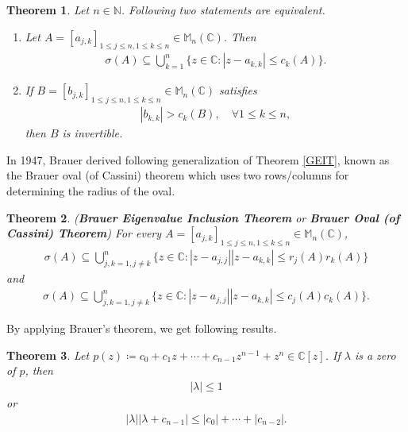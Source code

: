 \documentclass{amsart}
\newtheorem{theorem}{Theorem}[section]
\begin{document}
\begin{theorem} \cite{VARGA}
	Let $n \in \mathbb{N}$.  Following two statements are equivalent. 
	\begin{enumerate}[\upshape(i)]
		\item Let $A=[a_{j,k}]_{1\leq j\leq n, 1\leq k \leq n}\in  \mathbb{M}_n(\mathbb{C})$. Then 
		\begin{align*}
			\sigma(A)\subseteq \bigcup_{k=1}^n\{z \in \mathbb{C}: |z-a_{k,k}|\leq c_k(A)\}.
		\end{align*}
		\item 	If  $B=[b_{j,k}]_{1\leq j\leq n, 1\leq k \leq n}\in  \mathbb{M}_n(\mathbb{C})$ satisfies
		\begin{align*}
			|b_{k,k}|>c_k(B), \quad \forall 1\leq k \leq n,
		\end{align*}
		then $B$ is invertible. 
	\end{enumerate}	
\end{theorem}
In 1947, Brauer derived following generalization of Theorem \ref{GEIT}, known as the Brauer oval (of Cassini) theorem which uses two rows/columns  for determining the radius of the oval.
\begin{theorem} \cite{BRAUER, VARGA, MARCUSMINC} \label{BET} (\textbf{Brauer Eigenvalue Inclusion Theorem} or \textbf{Brauer Oval (of Cassini) Theorem})
	For every $A=[a_{j,k}]_{1\leq j\leq n, 1\leq k \leq n}\in  \mathbb{M}_n(\mathbb{C})$,
\begin{align*}
	\sigma(A)\subseteq \bigcup_{j,k=1, j \neq k}^n\{z \in \mathbb{C}: |z-a_{j, j}||z-a_{k,k}|\leq r_j(A)r_k(A)\}
\end{align*}
and 
\begin{align*}
	\sigma(A)\subseteq \bigcup_{j,k=1, j \neq k}^n\{z \in \mathbb{C}: |z-a_{j, j}||z-a_{k,k}|\leq c_j(A)c_k(A)\}.
\end{align*}
\end{theorem}
By applying Brauer's theorem, we get following results.
\begin{theorem} 
	Let $p(z)\coloneqq c_0+c_1z+\cdots +c_{n-1}z^{n-1}+z^n \in \mathbb{C}[z]$.  If $\lambda$ is a  zero of $p$, then 
	\begin{align*}
		|\lambda|\leq 1
	\end{align*}
	or 
	\begin{align*}
		|\lambda||\lambda+c_{n-1}|\leq |c_0|+\cdots +|c_{n-2}|.
	\end{align*}
\end{theorem}
\end{document}
